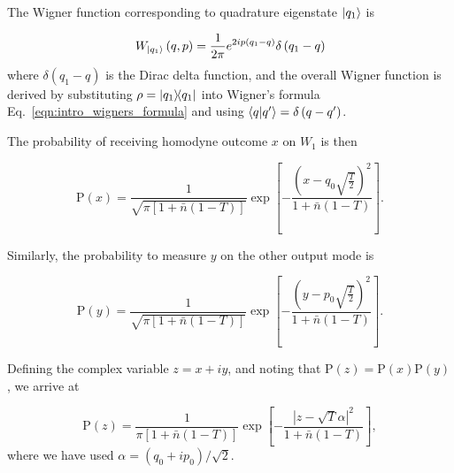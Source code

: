 The Wigner function corresponding to quadrature eigenstate $\ket{q_1}$ is

\begin{equation}
W_{\ket{q_1}}\left(q, p\right) = \frac{1}{2 \pi} e^{2 i p\left(q_1 - q\right)} \delta\left(q_1 - q\right)
\end{equation}
where $\delta\left(q_1 - q\right)$ is the Dirac delta function, and the overall Wigner function is derived by substituting $\rho = \dyad{q_1}$ into Wigner's formula Eq.~\ref{eqn:intro_wigners_formula} and using $\ip{q}{q^\prime} = \delta\left(q - q^\prime\right)$.

The probability of receiving homodyne outcome $x$ on $W_1$ is then 


\begin{equation}
\text{P}\left(x\right) = \frac{1}{\sqrt{\pi \left[1 + \bar{n}\left(1-T\right)\right]}}\exp\left[- \frac{\left(x - q_0 \sqrt{\frac{T}{2}}\right)^2}{1 + \bar{n}\left(1-T\right)} \right].
\end{equation}

\noindent Similarly, the probability to measure $y$ on the other output mode is

\begin{equation}
\text{P}\left(y\right) = \frac{1}{\sqrt{\pi \left[1 + \bar{n}\left(1-T\right)\right]}}\exp\left[- \frac{\left(y - p_0 \sqrt{\frac{T}{2}}\right)^2}{1 + \bar{n}\left(1-T\right)} \right].
\end{equation}

\noindent Defining the complex variable $z = x + i y$, and noting that $\text{P}\left(z\right) = \text{P}\left(x\right)\text{P}\left(y\right)$, we arrive at 

\begin{equation}\label{eqn:prob_noisy_output}
\text{P}\left(z\right) = \frac{1}{\pi \left[1 + \bar{n}\left(1-T\right)\right]} \exp\left[- \frac{\left| z - \sqrt{T} \alpha \right|^2}{1 + \bar{n}\left(1-T\right)} \right],
\end{equation}
where we have used $\alpha = \left(q_0 + i p_0\right)/\sqrt{2}$.

